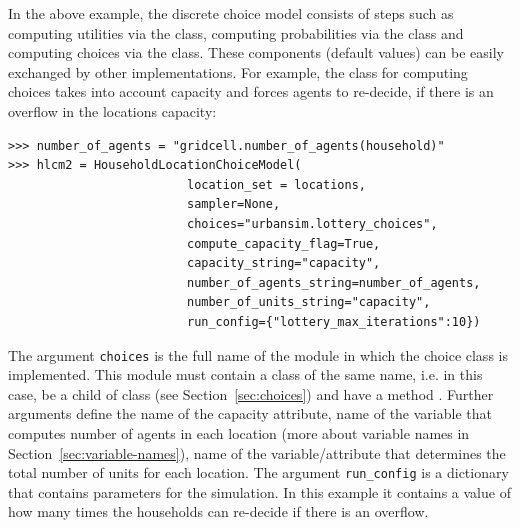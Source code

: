 In the above example, the discrete choice model consists of steps such as
computing utilities via the  class, computing
probabilities via the  class and computing
choices via the  class. These components
(default values) can be easily exchanged by other implementations. For
example, the class  for computing choices
takes into account capacity and forces agents to re-decide, if there is an
overflow in the locations capacity:
\begin{verbatim}
>>> number_of_agents = "gridcell.number_of_agents(household)"
>>> hlcm2 = HouseholdLocationChoiceModel(
                         location_set = locations,
                         sampler=None,
                         choices="urbansim.lottery_choices",
                         compute_capacity_flag=True,
                         capacity_string="capacity",
                         number_of_agents_string=number_of_agents,
                         number_of_units_string="capacity",
                         run_config={"lottery_max_iterations":10})
\end{verbatim}

The argument \verb|choices| is the full name of the module in which the choice
class is implemented. This module
must contain a class of the same name, i.e.
 in this case, be a child of  class 
(see Section~\ref{sec:choices}) and have a method .  Further arguments define the name of
the capacity attribute, name of the variable that computes number of agents in
each location (more about variable names in Section~\ref{sec:variable-names}), name of the
variable/attribute that determines the total number of units for each location. 
The argument \verb|run_config| is a dictionary that contains parameters for the simulation. In this example it contains a value
of how many times the households can re-decide if there is an overflow.

